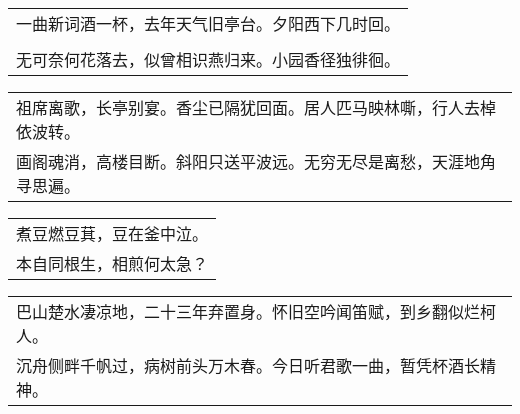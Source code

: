 \nopagebreak%
\nopagebreak%
\noindent\begin{minipage}{\linewidth}
  \vskip-3pt\begin{table}[H]
    \centering
    \begin{tabular}{@{}l@{}}
一曲新词酒一杯，去年天气旧亭台。夕阳西下几时回。\\
\\
无可奈何花落去，似曾相识燕归来。小园香径独徘徊。
    \end{tabular}
  \end{table}
\end{minipage}
\vspace{1cm}


\nopagebreak%
\nopagebreak%
\noindent\begin{minipage}{\linewidth}
  \vskip-3pt\begin{table}[H]
    \centering
    \begin{tabular}{@{}l@{}}
祖席离歌，长亭别宴。香尘已隔犹回面。居人匹马映林嘶，行人去棹依波转。\\
画阁魂消，高楼目断。斜阳只送平波远。无穷无尽是离愁，天涯地角寻思遍。
    \end{tabular}
  \end{table}
\end{minipage}
\vspace{1cm}


\nopagebreak%
\nopagebreak%
\noindent\begin{minipage}{\linewidth}
  \vskip-3pt\begin{table}[H]
    \centering
    \begin{tabular}{@{}l@{}}
煮豆燃豆萁，豆在釜中泣。\\
本自同根生，相煎何太急？
    \end{tabular}
  \end{table}
\end{minipage}
\vspace{1cm}


\nopagebreak%
\nopagebreak%
\noindent\begin{minipage}{\linewidth}
  \vskip-3pt\begin{table}[H]
    \centering
    \begin{tabular}{@{}l@{}}
巴山楚水凄凉地，二十三年弃置身。怀旧空吟闻笛赋，到乡翻似烂柯人。\\
沉舟侧畔千帆过，病树前头万木春。今日听君歌一曲，暂凭杯酒长精神。
    \end{tabular}
  \end{table}
\end{minipage}
\vspace{1cm}


